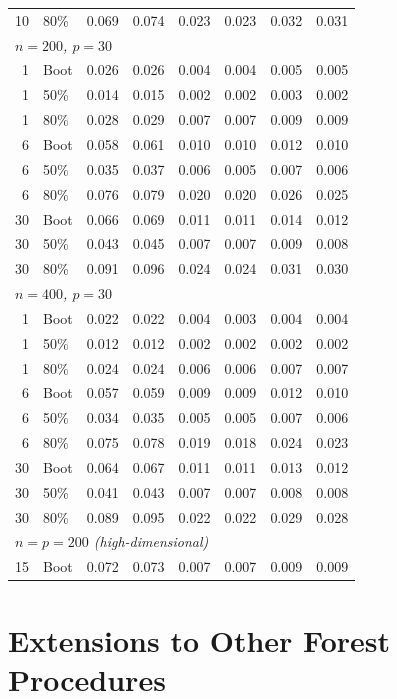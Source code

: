 \documentclass[11pt]{article}
\theoremstyle{plain}
\theoremstyle{definition}
\theoremstyle{remark}
\begin{document}
\begin{table}[htbp!]
\begin{tabular}{rlrrrrrr}
		10 & 80\% & 0.069 & 0.074 & 0.023 & 0.023 & 0.032 & 0.031 \\[4pt]
		\multicolumn{8}{l}{\textit{$n = 200$, $p = 30$}} \\[2pt]
		1  & Boot & 0.026 & 0.026 & 0.004 & 0.004 & 0.005 & 0.005 \\
		1  & 50\% & 0.014 & 0.015 & 0.002 & 0.002 & 0.003 & 0.002 \\
		1  & 80\% & 0.028 & 0.029 & 0.007 & 0.007 & 0.009 & 0.009 \\
		6  & Boot & 0.058 & 0.061 & 0.010 & 0.010 & 0.012 & 0.010 \\
		6  & 50\% & 0.035 & 0.037 & 0.006 & 0.005 & 0.007 & 0.006 \\
		6  & 80\% & 0.076 & 0.079 & 0.020 & 0.020 & 0.026 & 0.025 \\
		30 & Boot & 0.066 & 0.069 & 0.011 & 0.011 & 0.014 & 0.012 \\
		30 & 50\% & 0.043 & 0.045 & 0.007 & 0.007 & 0.009 & 0.008 \\
		30 & 80\% & 0.091 & 0.096 & 0.024 & 0.024 & 0.031 & 0.030 \\[4pt]
		\multicolumn{8}{l}{\textit{$n = 400$, $p = 30$}} \\[2pt]
		1  & Boot & 0.022 & 0.022 & 0.004 & 0.003 & 0.004 & 0.004 \\
		1  & 50\% & 0.012 & 0.012 & 0.002 & 0.002 & 0.002 & 0.002 \\
		1  & 80\% & 0.024 & 0.024 & 0.006 & 0.006 & 0.007 & 0.007 \\
		6  & Boot & 0.057 & 0.059 & 0.009 & 0.009 & 0.012 & 0.010 \\
		6  & 50\% & 0.034 & 0.035 & 0.005 & 0.005 & 0.007 & 0.006 \\
		6  & 80\% & 0.075 & 0.078 & 0.019 & 0.018 & 0.024 & 0.023 \\
		30 & Boot & 0.064 & 0.067 & 0.011 & 0.011 & 0.013 & 0.012 \\
		30 & 50\% & 0.041 & 0.043 & 0.007 & 0.007 & 0.008 & 0.008 \\
		30 & 80\% & 0.089 & 0.095 & 0.022 & 0.022 & 0.029 & 0.028 \\[4pt]
		\multicolumn{8}{l}{\textit{$n = p = 200$ (high-dimensional)}} \\[2pt]
		15 & Boot & 0.072 & 0.073 & 0.007 & 0.007 & 0.009 & 0.009 \\
		\hline
	\end{tabular}
\end{table}

\newpage 

\section{Extensions to Other Forest Procedures}
\label{app:extensions}
\end{document}

